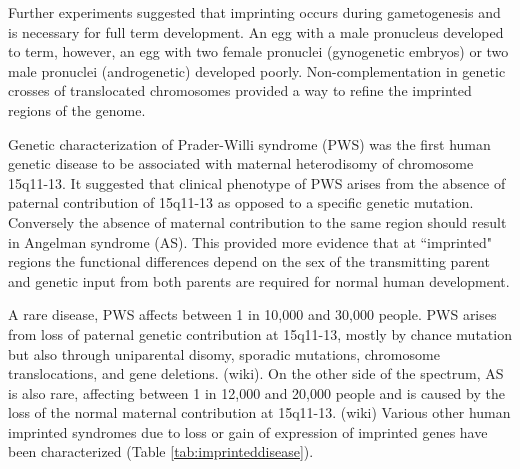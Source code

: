 Further experiments suggested that imprinting occurs during gametogenesis and is necessary for full term development. An egg with a male pronucleus developed to term, however, an egg with two female pronuclei (gynogenetic embryos) or two male pronuclei (androgenetic) developed poorly\cite{Surani1984,McGrath:1984ky}. Non-complementation in genetic crosses of translocated chromosomes provided a way to refine the imprinted regions of the genome\cite{Cattanach:1985hu}. 

Genetic characterization of Prader-Willi syndrome (PWS) was the first human genetic disease to be associated with maternal heterodisomy of chromosome 15q11-13\cite{Nicholls:vh}. It suggested that  clinical phenotype of PWS arises from the absence of paternal contribution of 15q11-13 as opposed to a specific genetic mutation. Conversely the absence of maternal contribution to the same region should result in Angelman syndrome (AS)\cite{Nicholls:vh,Reik:1989el}. This provided more evidence that at ``imprinted" regions the functional differences depend on the sex of the transmitting parent and genetic input from both parents are required for normal human development\cite{Nicholls:vh}.

A rare disease, PWS affects between 1 in 10,000 and 30,000 people. PWS arises from loss of paternal genetic contribution at 15q11-13, mostly by chance mutation but also through uniparental disomy, sporadic mutations, chromosome translocations, and gene deletions. (wiki). On the other side of the spectrum, AS is also rare, affecting between 1 in 12,000 and 20,000 people and is caused by the loss of the normal maternal contribution at 15q11-13. (wiki) Various other human imprinted syndromes due to loss or gain of expression of imprinted genes have been characterized (Table \ref{tab:imprinteddisease}). \cite{Peters2014}


